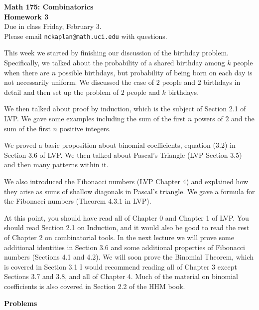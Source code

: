 \documentclass[11pt]{article}
\begin{document}
\begin{center}
{\Large \bf Math 175: Combinatorics} \\
{\Large \bf Homework 3}\\
{\Large Due in class Friday, February 3. \\
Please email \texttt{nckaplan@math.uci.edu} with questions.}
\end{center}

\vspace{5mm}

This week we started by finishing our discussion of the birthday problem.  Specifically, we talked about the probability of a shared birthday among $k$ people when there are $n$ possible birthdays, but probability of being born on each day is not necessarily uniform.  We discussed the case of $2$ people and $2$ birthdays in detail and then set up the problem of $2$ people and $k$ birthdays.

We then talked about proof by induction, which is the subject of Section 2.1 of LVP.  We gave some examples including the sum of the first $n$ powers of $2$ and the sum of the first $n$ positive integers.  

We proved a basic proposition about binomial coefficients, equation (3.2) in Section 3.6 of LVP.  We then talked about Pascal's Triangle (LVP Section 3.5) and then many patterns within it.

We also introduced the Fibonacci numbers (LVP Chapter 4) and explained how they arise as sums of shallow diagonals in Pascal's triangle.  We gave a formula for the Fibonacci numbers (Theorem 4.3.1 in LVP).

At this point, you should have read all of Chapter 0 and Chapter 1 of LVP.  You should read Section 2.1 on Induction, and it would also be good to read the rest of Chapter 2 on combinatorial tools.  In the next lecture we will prove some additional identities in Section 3.6 and some additional properties of Fibonacci numbers (Sections 4.1 and 4.2).  We will soon prove the Binomial Theorem, which is covered in Section 3.1  I would recommend reading all of Chapter 3 except Sections 3.7 and 3.8, and all of Chapter 4.  Much of the material on binomial coefficients is also covered in Section 2.2 of the HHM book.



\newpage


\centerline{ \bf \Large Problems}
\end{document}
